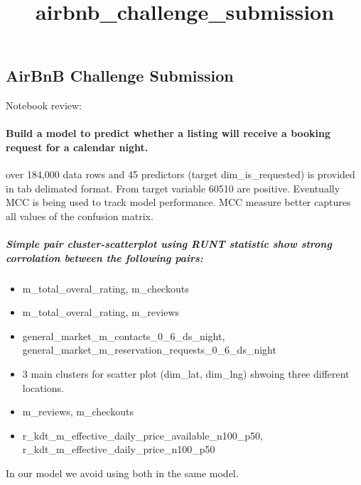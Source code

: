 \documentclass[11pt]{article}
\title{airbnb\_challenge\_submission}
\providecommand{\tightlist}{%
      \setlength{\itemsep}{0pt}\setlength{\parskip}{0pt}}
\begin{document}
    
    
    \maketitle
    
    

    
    \subsection{AirBnB Challenge
Submission}\label{airbnb-challenge-submission}

Notebook review:

\paragraph{Build a model to predict whether a listing will receive a
booking request for a calendar
night.}\label{build-a-model-to-predict-whether-a-listing-will-receive-a-booking-request-for-a-calendar-night.}

over 184,000 data rows and 45 predictors (target dim\_is\_requested) is
provided in tab delimated format. From target variable 60510 are
positive. Eventually MCC is being used to track model performance. MCC
measure better captures all values of the confusion matrix.

\subparagraph{Simple pair cluster-scatterplot using RUNT statistic show
strong corrolation between the following
pairs:}\label{simple-pair-cluster-scatterplot-using-runt-statistic-show-strong-corrolation-between-the-following-pairs}

\begin{itemize}
\tightlist
\item
  m\_total\_overal\_rating, m\_checkouts
\item
  m\_total\_overal\_rating, m\_reviews
\item
  general\_market\_m\_contacts\_0\_6\_ds\_night,
  general\_market\_m\_reservation\_requests\_0\_6\_ds\_night
\item
  3 main clusters for scatter plot (dim\_lat, dim\_lng) shwoing three
  different locations.
\item
  m\_reviews, m\_checkouts
\item
  r\_kdt\_m\_effective\_daily\_price\_available\_n100\_p50,
  r\_kdt\_m\_effective\_daily\_price\_n100\_p50
\end{itemize}

In our model we avoid using both in the same model.
\end{document}

